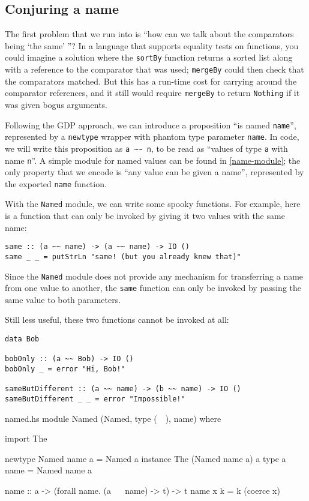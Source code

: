 \documentclass[format=sigplan, review=false, screen=true]{acmart}
\begin{document}
\subsection{Conjuring a name}
The first problem that we run into is ``how can we talk about the comparators
being `the same' ''? In a language that supports equality tests on functions,
you could imagine a solution where the \texttt{sortBy} function returns a sorted
list along with a reference to the comparator that was used; \texttt{mergeBy} could
then check that the comparators matched. But this has a run-time cost for carrying
around the comparator references, and it still would require \texttt{mergeBy} to
return \texttt{Nothing} if it was given bogus arguments.

Following the GDP approach, we can introduce a proposition ``is named \texttt{name}'',
represented by a \texttt{newtype} wrapper with phantom type parameter \texttt{name}.
In code, we will write this proposition as \verb|a ~~ n|, to be read as
``values of type \texttt{a} with name \texttt{n}''. A simple module for named values
can be found in \cref{name-module}; the only property that we encode is
``any value can be given a name'', represented by the exported \texttt{name} function.

With the \texttt{Named} module, we can write some spooky functions. For example,
here is a function that can only be invoked by giving it two values with the same
name:
\begin{verbatim}
same :: (a ~~ name) -> (a ~~ name) -> IO ()
same _ _ = putStrLn "same! (but you already knew that)"
\end{verbatim}
Since the \texttt{Named} module does not provide any mechanism for transferring
a name from one value to another, the \texttt{same} function can only be invoked
by passing the same value to both parameters.

Still less useful, these two functions cannot be invoked at all:
\begin{verbatim}
data Bob

bobOnly :: (a ~~ Bob) -> IO ()
bobOnly _ = error "Hi, Bob!"

sameButDifferent :: (a ~~ name) -> (b ~~ name) -> IO ()
sameButDifferent _ _ = error "Impossible!"
\end{verbatim}
\begin{filecontents*}{named.hs}
module Named (Named, type (~~), name) where

import The

newtype Named name a = Named a
instance The (Named name a) a
type a ~~ name = Named name a

name :: a -> (forall name. (a ~~ name) -> t) -> t
name x k = k (coerce x)
\end{filecontents*}
\end{document}
